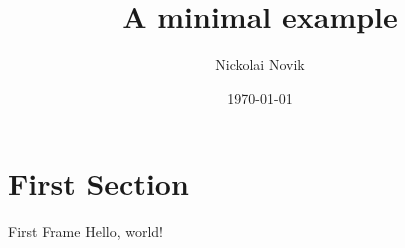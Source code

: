 \documentclass{beamer}
\title{A minimal example}
\date{\today}
\author{Nickolai Novik}
\institute{Introduction To Distributed Tracing}
\begin{document}
  \maketitle
  \section{First Section}
  \begin{frame}{First Frame}
    Hello, world!
  \end{frame}
\end{document}
